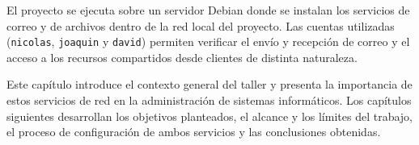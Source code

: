 El proyecto se ejecuta sobre un servidor Debian donde se instalan los servicios
de correo y de archivos dentro de la red local del proyecto. Las cuentas
utilizadas (\texttt{nicolas}, \texttt{joaquin} y \texttt{david}) permiten
verificar el envío y recepción de correo y el acceso a los recursos
compartidos desde clientes de distinta naturaleza.

Este capítulo introduce el contexto general del taller y presenta la
importancia de estos servicios de red en la administración de sistemas
informáticos. Los capítulos siguientes desarrollan los objetivos planteados,
el alcance y los límites del trabajo, el proceso de configuración de ambos
servicios y las conclusiones obtenidas.